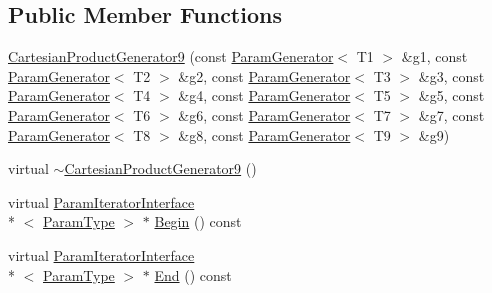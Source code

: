 \subsection*{Public Member Functions}
\begin{DoxyCompactItemize}
\item 
\hyperlink{classtesting_1_1internal_1_1_cartesian_product_generator9_aff06c7992c06297c6bf5ad5eb56534e9}{Cartesian\-Product\-Generator9} (const \hyperlink{classtesting_1_1internal_1_1_param_generator}{Param\-Generator}$<$ T1 $>$ \&g1, const \hyperlink{classtesting_1_1internal_1_1_param_generator}{Param\-Generator}$<$ T2 $>$ \&g2, const \hyperlink{classtesting_1_1internal_1_1_param_generator}{Param\-Generator}$<$ T3 $>$ \&g3, const \hyperlink{classtesting_1_1internal_1_1_param_generator}{Param\-Generator}$<$ T4 $>$ \&g4, const \hyperlink{classtesting_1_1internal_1_1_param_generator}{Param\-Generator}$<$ T5 $>$ \&g5, const \hyperlink{classtesting_1_1internal_1_1_param_generator}{Param\-Generator}$<$ T6 $>$ \&g6, const \hyperlink{classtesting_1_1internal_1_1_param_generator}{Param\-Generator}$<$ T7 $>$ \&g7, const \hyperlink{classtesting_1_1internal_1_1_param_generator}{Param\-Generator}$<$ T8 $>$ \&g8, const \hyperlink{classtesting_1_1internal_1_1_param_generator}{Param\-Generator}$<$ T9 $>$ \&g9)
\item 
virtual \hyperlink{classtesting_1_1internal_1_1_cartesian_product_generator9_a87b0f2bf8e24af0e3feb1114bad4af4f}{$\sim$\-Cartesian\-Product\-Generator9} ()
\item 
virtual \hyperlink{classtesting_1_1internal_1_1_param_iterator_interface}{Param\-Iterator\-Interface}\\*
$<$ \hyperlink{classtesting_1_1internal_1_1_cartesian_product_generator9_a333de873be0c11965024ad94d5e958d9}{Param\-Type} $>$ $\ast$ \hyperlink{classtesting_1_1internal_1_1_cartesian_product_generator9_a346f369cf3b1bf866d47f17074f13d13}{Begin} () const 
\item 
virtual \hyperlink{classtesting_1_1internal_1_1_param_iterator_interface}{Param\-Iterator\-Interface}\\*
$<$ \hyperlink{classtesting_1_1internal_1_1_cartesian_product_generator9_a333de873be0c11965024ad94d5e958d9}{Param\-Type} $>$ $\ast$ \hyperlink{classtesting_1_1internal_1_1_cartesian_product_generator9_af00c2840f7270a74c2104fead936498e}{End} () const 
\end{DoxyCompactItemize}


